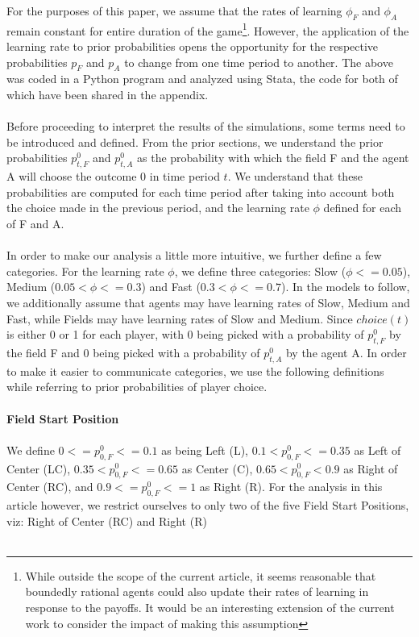 \documentclass[12pt]{article}
\begin{document}
\noindent For the purposes of this paper, we assume that the rates of learning $\phi_F$ and $\phi_A$ remain constant for entire duration of the game\footnote{While outside the scope of the current article, it seems reasonable that boundedly rational agents could also update their rates of learning in response to the payoffs. It would be an interesting extension of the current work to consider the impact of making this assumption}. However, the application of the learning rate to prior probabilities opens the opportunity for the respective probabilities $p_F$ and $p_A$ to change from one time period to another. The above was coded in a Python program and analyzed using Stata, the code for both of which have been shared in the appendix.\\\\
Before proceeding to interpret the results of the simulations, some terms need to be introduced and defined. From the prior sections, we understand the prior probabilities $p_{t,F}^0$ and $p_{t,A}^0$ as the probability with which the field F and the agent A will choose the outcome 0 in time period $t$. We understand that these probabilities are computed for each time period after taking into account both the choice made in the previous period, and the learning rate $\phi$ defined for each of F and A. \\\\
In  order to make our analysis a little more intuitive, we further define a few categories. For the learning rate $\phi$, we define three categories: Slow ($\phi <= 0.05$), Medium ($0.05 < \phi <= 0.3$) and Fast  ($0.3 < \phi <= 0.7$). In the models to follow, we additionally assume that agents may have learning rates of Slow, Medium and Fast, while Fields may have learning rates of Slow and Medium. Since $choice(t)$ is either 0 or 1 for each player, with 0 being picked with a probability of $p_{t,F}^0$ by the field F and 0 being picked with a probability of $p_{t,A}^0$ by the agent A. In order to make it easier to communicate categories, we use the following definitions while referring to prior probabilities of player choice. \\\\
\textbf{Field Start Position}\\\\
We define $0 <= p_{0,F}^0 <= 0.1$ as being Left (L),  $0.1 < p_{0,F}^0 <= 0.35$ as Left of Center (LC), $0.35 < p_{0,F}^0 <= 0.65$ as Center (C),  $0.65 < p_{0,F}^0 < 0.9$ as  Right of Center (RC), and $0.9 <= p_{0,F}^0 <= 1$ as Right (R). For the analysis in this article however, we restrict ourselves to only two of the five Field Start Positions, viz: Right of Center (RC) and Right (R)\\\\
\end{document}

